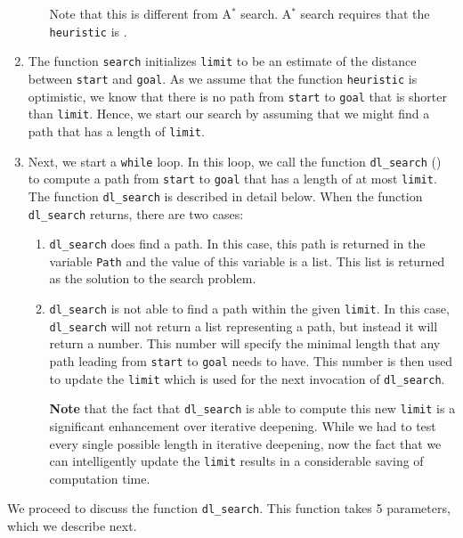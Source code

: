 \begin{enumerate}
\begin{enumerate}
            Note that this is different from A$^*$ search. A$^*$ search requires that the \texttt{heuristic} is 
            .
     \end{enumerate}
\item The function \texttt{search} initializes \texttt{limit} to be an estimate of the distance
      between \texttt{start} and \texttt{goal}.  As we assume that the function \texttt{heuristic} is
      optimistic, we know that there is no path from \texttt{start} to \texttt{goal} that is shorter than
      \texttt{limit}.  Hence, we start our search by assuming that we might find a path that has a length of
      \texttt{limit}.
\item Next, we start a \texttt{while} loop.  In this loop, we call the function \texttt{dl\_search} 
      () to compute a path from
      \texttt{start} to \texttt{goal} that has a length of at most \texttt{limit}.  The function
      \texttt{dl\_search}  is described in detail below.
      When the function \texttt{dl\_search} returns, there are two cases:
      \begin{enumerate}
      \item \texttt{dl\_search} does find a path.  In this case, this path is returned in the variable
            \texttt{Path} and the value of this variable is a list.  This list is returned as the solution to
            the search problem.
      \item \texttt{dl\_search} is not able to find a path within the given \texttt{limit}.  In this case,
            \texttt{dl\_search} will not return a list representing a path, but instead it will return a number.
            This number will specify the minimal length that any path leading from \texttt{start} to \texttt{goal} needs to
            have.  This number is then used to update the \texttt{limit} which is used for the next
            invocation of \texttt{dl\_search}.

            \textbf{Note} that the fact that \texttt{dl\_search} is able to compute this new \texttt{limit} is
            a significant enhancement over iterative deepening.  While we had to test every single possible
            length in iterative deepening, now the fact that we can intelligently update the \texttt{limit}
            results in a considerable saving of computation time.
      \end{enumerate}
\end{enumerate}
We proceed to discuss the function \texttt{dl\_search}.  This function takes 5 parameters, which we describe next.
